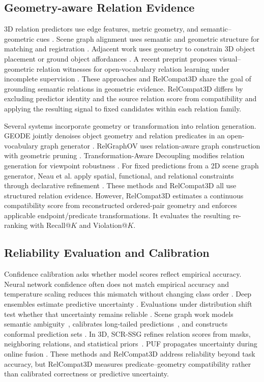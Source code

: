 \subsection{Geometry-aware Relation Evidence}
3D relation predictors use edge features, metric geometry, and semantic--geometric cues \cite{zhang2021exploiting,feng20233d}. Scene graph alignment uses semantic and geometric structure for matching and registration \cite{sarkar2023sgaligner,xie2024sg}. Adjacent work uses geometry to constrain 3D object placement or ground object affordances \cite{huang2025fireplace,shao2025great}. A recent preprint proposes visual--geometric relation witnesses for open-vocabulary relation learning under incomplete supervision \cite{nguyen2026relwitness}. These approaches and RelCompat3D share the goal of grounding semantic relations in geometric evidence. RelCompat3D differs by excluding predictor identity and the source relation score from compatibility and applying the resulting signal to fixed candidates within each relation family.

Several systems incorporate geometry or transformation into relation generation. GEODE jointly denoises object geometry and relation predicates in an open-vocabulary graph generator \cite{Feng_2026_CVPR}. RelGraphOV uses relation-aware graph construction with geometric pruning \cite{chen2026beyond}. Transformation-Aware Decoupling modifies relation generation for viewpoint robustness \cite{sun2026not}. For fixed predictions from a 2D scene graph generator, Neau et al. apply spatial, functional, and relational constraints through declarative refinement \cite{neau2026visual}. These methods and RelCompat3D all use structured relation evidence. However, RelCompat3D estimates a continuous compatibility score from reconstructed ordered-pair geometry and enforces applicable endpoint/predicate transformations. It evaluates the resulting re-ranking with Recall@$K$ and Violation@$K$.

\subsection{Reliability Evaluation and Calibration}
Confidence calibration asks whether model scores reflect empirical accuracy. Neural network confidence often does not match empirical accuracy and temperature scaling reduces this mismatch without changing class order \cite{guo2017calibration}. Deep ensembles estimate predictive uncertainty \cite{lakshminarayanan2017simple}. Evaluations under distribution shift test whether that uncertainty remains reliable \cite{Ovadia2019CanYT}. Scene graph work models semantic ambiguity~\cite{yang2021probabilistic}, calibrates long-tailed predictions~\cite{zhu2024calibration}, and constructs conformal prediction sets \cite{nag2025conformal}. In 3D, SCR-SSG refines relation scores from masks, neighboring relations, and statistical priors~\cite{yeo2025statistical}. PUF propagates uncertainty during online fusion \cite{yang2026puf}. These methods and RelCompat3D address reliability beyond task accuracy, but RelCompat3D measures predicate--geometry compatibility rather than calibrated correctness or predictive uncertainty.

